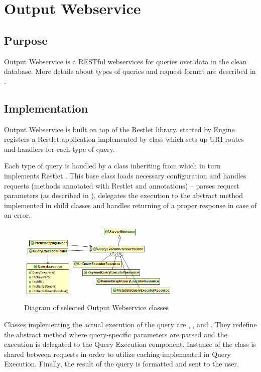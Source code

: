 \section{Output Webservice}
\subsection{Purpose}
Output Webservice is a RESTful webservices for queries over data in the clean database. More details about types of queries and request format are described in .

\subsection{Implementation}
Output Webservice is built on top of the Restlet library.  started by Engine registers a Restlet application implemented by class  which sets up URI routes and handlers for each type of query.

Each type of query is handled by a class inheriting from  which in turn implements Restlet . This base class loads necessary configuration and handles requests (methods annotated with Restlet  and  annotations) -- parses request parameters (as described in ), delegates the execution to the abstract  method implemented in child classes and handles returning of a proper response in case of an error.

\begin{figure}[htb]
    \centering
    \includegraphics[width=0.7\textwidth]{images/dia-outputws-resources.png}
    \caption{Diagram of selected Output Webservice classes}
	\label{fig:outputwsResources}
\end{figure}


Classes implementing the actual execution of the query are , ,  and \linebreak[4] . They redefine the abstract  method where query-specific parameters are parsed and the execution is delegated to the Query Execution component. Instance of the  class is shared between requests in order to utilize caching implemented in Query Execution. Finally, the result of the query is formatted and sent to the user.


